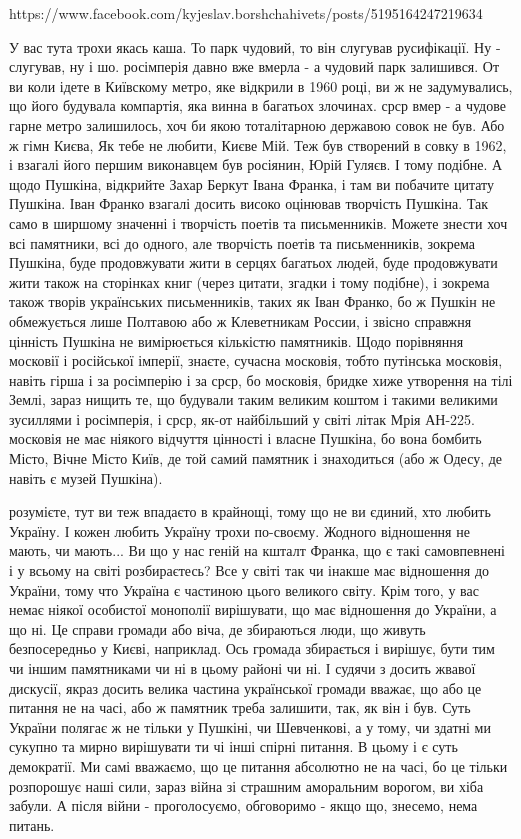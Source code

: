 https://www.facebook.com/kyjeslav.borshchahivets/posts/5195164247219634

У вас тута трохи якась каша. То парк чудовий, то він слугував русифікації. Ну -
слугував, ну і шо. росімперія давно вже вмерла - а чудовий парк залишився. От
ви коли ідете в Київскому метро, яке відкрили в 1960 році, ви ж не
задумувались, що його будувала компартія, яка винна в багатьох злочинах. срср
вмер - а чудове гарне метро залишилось, хоч би якою тоталітарною державою совок
не був. Або ж гімн Києва, Як тебе не любити, Києве Мій. Теж був створений в
совку в 1962, і взагалі його першим виконавцем був росіянин, Юрій Гуляєв. І
тому подібне. А щодо Пушкіна, відкрийте Захар Беркут Івана Франка, і там ви
побачите цитату Пушкіна. Іван Франко взагалі досить високо оцінював творчість
Пушкіна. Так само в ширшому значенні і творчість поетів та письменників. Можете
знести хоч всі памятники, всі до одного, але творчість поетів та письменників,
зокрема Пушкіна, буде продовжувати жити в серцях багатьох людей, буде
продовжувати жити також на сторінках книг (через цитати, згадки і тому
подібне), і зокрема також творів українських письменників, таких як Іван
Франко, бо ж Пушкін не обмежується лише Полтавою або ж Клеветникам России, і
звісно справжня цінність Пушкіна не вимірюється кількістю памятників. Щодо
порівняння московії і російської імперії, знаєте, сучасна московія, тобто
путінська московія, навіть гірша і за росімперію і за срср, бо московія, бридке
хиже утворення на тілі Землі, зараз нищить те, що будували таким великим коштом
і такими великими зусиллями і росімперія, і срср, як-от найбільший у світі
літак Мрія АН-225. московія не має ніякого відчуття цінності і власне Пушкіна,
бо вона бомбить Місто, Вічне Місто Київ, де той самий памятник і знаходиться
(або ж Одесу, де навіть є музей Пушкіна).

розумієте, тут ви теж впадаєто в крайнощі, тому що не ви єдиний, хто любить
Україну. І кожен любить Україну трохи по-своєму. Жодного відношення не мають,
чи мають... Ви що у нас геній на кшталт Франка, що є такі самовпевнені і у
всьому на світі розбираєтесь? Все у світі так чи інакше має відношення до
України, тому что Україна є частиною цього великого світу. Крім того, у вас
немає ніякої особистої монополії вирішувати, що має відношення до України, а що
ні. Це справи громади або віча, де збираються люди, що живуть безпосередньо у
Києві, наприклад. Ось громада збирається і вирішує, бути тим чи іншим
памятниками чи ні в цьому районі чи ні. І судячи з досить жвавої дискусії,
якраз досить велика частина української громади вважає, що або це питання не на
часі, або ж памятник треба залишити, так, як він і був. Суть України полягає ж
не тільки у Пушкіні, чи Шевченкові, а у тому, чи здатні ми сукупно та мирно
вирішувати ти чі інші спірні питання. В цьому і є суть демократії. Ми самі
вважаємо, що це питання абсолютно не на часі, бо це тільки розпорошує наші
сили, зараз війна зі страшним аморальним ворогом, ви хіба забули. А після війни
- проголосуємо, обговоримо - якщо що, знесемо, нема питань.

